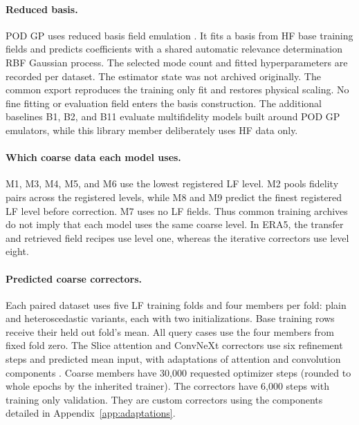 \paragraph{Reduced basis.}
POD GP uses reduced basis field emulation \citep{higdon2008}. It fits a basis from
HF base training fields and predicts coefficients with a shared
automatic relevance determination RBF Gaussian process. The selected mode count and fitted
hyperparameters are recorded per dataset. The estimator state was not archived originally. The common export reproduces the training only fit and restores physical scaling.
No fine fitting or evaluation field enters the basis construction.
The additional baselines B1, B2, and B11 evaluate multifidelity models built around POD GP emulators,
while this library member deliberately uses HF data only.

\paragraph{Which coarse data each model uses.}
M1, M3, M4, M5, and M6 use the lowest registered LF level. M2 pools fidelity
pairs across the registered levels, while M8 and M9 predict the finest
registered LF level before correction. M7 uses no LF fields.
Thus common training archives do not imply that each model uses the same
coarse level. In ERA5, the transfer and retrieved field recipes use level one,
whereas the iterative correctors use level eight.

\paragraph{Predicted coarse correctors.}
Each paired dataset uses five LF training folds and four members per fold: plain and
heteroscedastic variants, each with two initializations. Base training rows receive their
held out fold's mean. All query cases use the four members from fixed fold zero.
The Slice attention and ConvNeXt correctors use six refinement steps and predicted mean input,
with adaptations of attention and convolution components \citep{wu2024transolver,liu2022convnext}.
Coarse members have 30,000 requested optimizer steps (rounded to whole epochs by the inherited
trainer). The correctors have 6,000 steps with training only validation. They are custom correctors using the components detailed in
Appendix~\ref{app:adaptations}.


